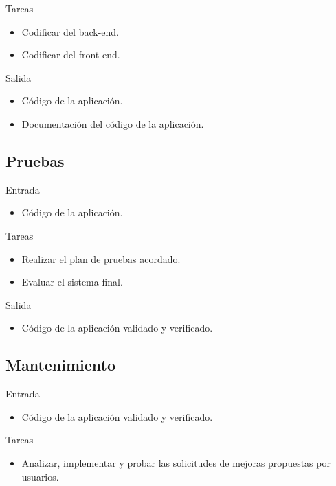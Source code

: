 Tareas
\begin{itemize}[leftmargin=3.5em]
  \item Codificar del \gls{back-end}.
  \item Codificar del \gls{front-end}.
\end{itemize}

Salida
\begin{itemize}[leftmargin=3.5em]
  \item Código de la aplicación.
  \item Documentación del código de la aplicación.
\end{itemize}

\subsection*{Pruebas\label{ssec:dp:pruebas}}

Entrada
\begin{itemize}[leftmargin=3.5em]
  \item Código de la aplicación.
\end{itemize}

Tareas
\begin{itemize}[leftmargin=3.5em]
  \item Realizar el plan de pruebas acordado.
  \item Evaluar el sistema final.
\end{itemize}

Salida
\begin{itemize}[leftmargin=3.5em]
  \item Código de la aplicación validado y verificado.
\end{itemize}

\subsection*{Mantenimiento\label{ssec:dp:mantenimiento}}

Entrada
\begin{itemize}[leftmargin=3.5em]
  \item Código de la aplicación validado y verificado.
\end{itemize}

Tareas
\begin{itemize}[leftmargin=3.5em]
  \item Analizar, implementar y probar las solicitudes de mejoras propuestas por usuarios.
\end{itemize}

